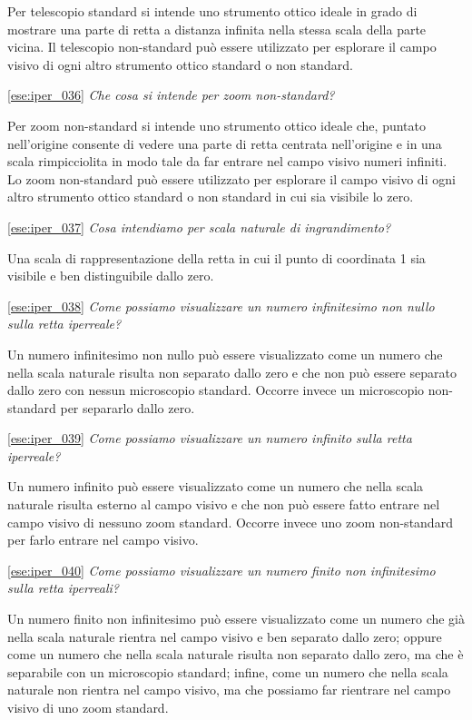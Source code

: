 Per telescopio standard si intende uno strumento ottico ideale in grado di 
mostrare una parte di retta a distanza infinita nella stessa scala della parte 
vicina. Il telescopio non-standard può essere utilizzato per esplorare il 
campo visivo di ogni altro strumento ottico standard o non standard.

\ref{ese:iper_036} 
\emph{Che cosa si intende per zoom non-standard?}

Per zoom non-standard si intende uno strumento ottico ideale che, puntato 
nell'origine consente di vedere una parte di retta centrata nell'origine e in 
una scala rimpicciolita in modo tale da far entrare nel campo visivo numeri 
infiniti. Lo zoom non-standard può essere utilizzato per esplorare il campo 
visivo di ogni altro strumento ottico standard o non standard in cui sia 
visibile lo zero.

\ref{ese:iper_037} 
\emph{Cosa intendiamo per scala naturale di ingrandimento?}

Una scala di rappresentazione della retta in cui il punto di coordinata 1 sia 
visibile e ben distinguibile dallo zero.

\ref{ese:iper_038} 
\emph{Come possiamo visualizzare un numero infinitesimo non nullo sulla retta
iperreale?}

Un numero infinitesimo non nullo può essere visualizzato come un numero che 
nella scala naturale risulta non separato dallo zero e che non può essere 
separato dallo zero con nessun microscopio standard. Occorre invece un 
microscopio non-standard per separarlo dallo zero.

\ref{ese:iper_039} 
\emph{Come possiamo visualizzare un numero infinito sulla retta iperreale?}

Un numero infinito può essere visualizzato come un numero che nella scala 
naturale risulta esterno al campo visivo e che non può essere fatto entrare nel 
campo visivo di nessuno zoom standard. Occorre invece uno zoom non-standard per 
farlo entrare nel campo visivo.

\ref{ese:iper_040} 
\emph{Come possiamo visualizzare un numero finito non infinitesimo sulla retta
iperreali?}

Un numero finito non infinitesimo può essere visualizzato come un numero che 
già nella scala naturale rientra nel campo visivo e ben separato dallo zero; 
oppure come un numero che nella scala naturale risulta non separato dallo zero, 
ma che è separabile con un microscopio standard; infine, come un numero che 
nella scala naturale non rientra nel campo visivo, ma che possiamo far 
rientrare nel campo visivo di uno zoom standard.

